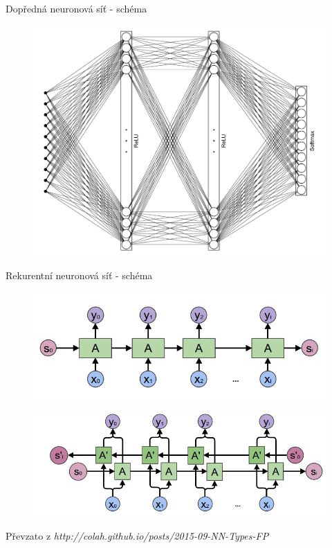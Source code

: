 \documentclass[10pt]{beamer}
\begin{document}
\begin{frame}{Dopředná neuronová síť - schéma}
	\begin{figure}
		\includegraphics[width= 0.8\linewidth]{nn.pdf}
	\end{figure}
\end{frame}

\begin{frame}{Rekurentní neuronová síť - schéma}
	\begin{figure}
		\includegraphics[width= 0.8\linewidth]{rnn_general.png}
	\end{figure}
	
	\begin{figure}
		\includegraphics[width= 0.8\linewidth]{rnn_bidirectional.png}
	\end{figure}
	
	Převzato z \textit{http://colah.github.io/posts/2015-09-NN-Types-FP}
\end{frame}
\end{document}
